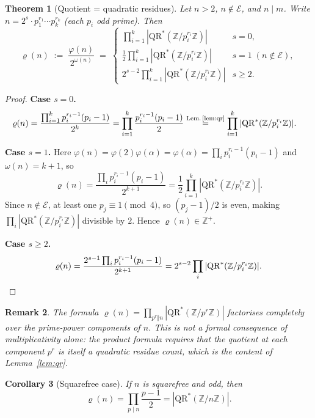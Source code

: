 \documentclass[12pt]{amsart}
\theoremstyle{bluehead}
\newtheorem{theorem}{Theorem}[section]
\newtheorem{corollary}[theorem]{Corollary}
\theoremstyle{orangehead}
\theoremstyle{greenhead}
\newtheorem{remark}[theorem]{Remark}
\newcommand{\Z}{\mathbb{Z}}
\newcommand{\QRS}{\mathrm{QR}^{*}}
\renewcommand{\phi}{\varphi}
\newcommand{\Exc}{\mathcal{E}}
\begin{document}
\begin{theorem}[Quotient = quadratic residues]\label{thm:quot}
  Let $n>2$, $n\notin\Exc$, and $n\mid m$.
  Write $n=2^s\cdot p_1^{r_1}\cdots p_k^{r_k}$ (each $p_i$ odd prime).
  Then
  \begin{equation}\label{eq:quot}
    \varrho(n)
    \;:=\;\frac{\phi(n)}{2^{\omega(n)}}
    \;=\;
    \begin{cases}
      \displaystyle\prod_{i=1}^k|\QRS(\Z/p_i^{r_i}\Z)|
      & s=0,\\[8pt]
      \displaystyle\frac{1}{2}\prod_{i=1}^k|\QRS(\Z/p_i^{r_i}\Z)|
      & s=1\;(n\notin\Exc),\\[8pt]
      \displaystyle 2^{s-2}\prod_{i=1}^k|\QRS(\Z/p_i^{r_i}\Z)|
      & s\ge2.
    \end{cases}
  \end{equation}
\end{theorem}

\begin{proof}
\textbf{Case $s=0$.}
\begin{align*}
  \varrho(n)
  &=\frac{\prod_{i=1}^k p_i^{r_i-1}(p_i-1)}{2^k}
   =\prod_{i=1}^k\frac{p_i^{r_i-1}(p_i-1)}{2}
   \overset{\text{Lem.\,\ref{lem:qr}}}{=}
   \prod_{i=1}^k|\QRS(\Z/p_i^{r_i}\Z)|.
\end{align*}

\textbf{Case $s=1$.}
Here $\phi(n)=\phi(2)\phi(\alpha)=\phi(\alpha)=\prod_i p_i^{r_i-1}(p_i-1)$
and $\omega(n)=k+1$, so
\[
  \varrho(n)
  =\frac{\prod_i p_i^{r_i-1}(p_i-1)}{2^{k+1}}
  =\frac{1}{2}\prod_{i=1}^k|\QRS(\Z/p_i^{r_i}\Z)|.
\]
Since $n\notin\Exc$, at least one $p_j\equiv1\pmod4$,
so $(p_j-1)/2$ is even, making $\prod_i|\QRS(\Z/p_i^{r_i}\Z)|$
divisible by $2$.  Hence $\varrho(n)\in\Z^+$.

\textbf{Case $s\ge2$.}
\[
  \varrho(n)=\frac{2^{s-1}\prod_i p_i^{r_i-1}(p_i-1)}{2^{k+1}}
  =2^{s-2}\prod_i|\QRS(\Z/p_i^{r_i}\Z)|.\qedhere
\]
\end{proof}

\begin{remark}
  The formula $\varrho(n)=\prod_{p^r\Vert n}|\QRS(\Z/p^r\Z)|$ factorises
  completely over the prime-power components of $n$.  This is not a formal
  consequence of multiplicativity alone: the product formula requires that
  the quotient at each component $p^r$ is itself a quadratic residue count,
  which is the content of Lemma~\ref{lem:qr}.
\end{remark}

\begin{corollary}[Squarefree case]\label{cor:sqfree}
  If $n$ is squarefree and odd, then
  \[
    \varrho(n)=\prod_{p\mid n}\frac{p-1}{2}
    =|\QRS(\Z/n\Z)|.
  \]
\end{corollary}
\end{document}
